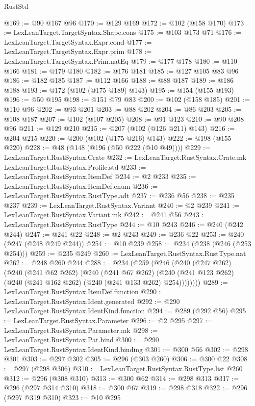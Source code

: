 \begin{lexlean}{RustStd}
\begin{coremodule}
@169 := @90 @167 @96
@170 := @129 @169
@172 := @102 (@158 @170)
@173 := LexLeanTarget.TargetSyntax.Shape.cons
@175 := @103 @173 @71
@176 := LexLeanTarget.TargetSyntax.Expr.cond
@177 := LexLeanTarget.TargetSyntax.Expr.prim
@178 := LexLeanTarget.TargetSyntax.Prim.natEq
@179 := @177 @178
@180 := @110 @166
@181 := @179 @180
@182 := @176 @181
@185 := @127 @105 @83 @96
@186 := @182 @185
@187 := @112 @166
@188 := @88 @187
@189 := @186 @188
@193 := @172 (@102 (@175 @189) @143)
@195 := @154 (@155 @193)
@196 := @50 @195
@198 := @151 @79 @83
@200 := @102 (@158 @185)
@201 := @110 @96
@202 := @93 @201
@203 := @88 @202
@204 := @86 @203
@205 := @108 @187
@207 := @102 (@107 @205)
@208 := @91 @123
@210 := @90 @208 @96
@211 := @129 @210
@215 := @207 (@102 (@126 @211) @143)
@216 := @204 @215
@220 := @200 (@102 (@175 @216) @143)
@222 := @198 (@155 @220)
@228 := @48 (@148 (@196 (@50 @222 (@10 @49))))
@229 := LexLeanTarget.RustSyntax.Crate
@232 := LexLeanTarget.RustSyntax.Crate.mk LexLeanTarget.RustSyntax.Profile.std
@233 := LexLeanTarget.RustSyntax.ItemDef
@234 := @2 @233
@235 := LexLeanTarget.RustSyntax.ItemDef.enum
@236 := LexLeanTarget.RustSyntax.RustType.adt
@237 := @236 @56
@238 := @235 @237
@239 := LexLeanTarget.RustSyntax.Variant
@240 := @2 @239
@241 := LexLeanTarget.RustSyntax.Variant.mk
@242 := @241 @56
@243 := LexLeanTarget.RustSyntax.RustType
@244 := @10 @243
@246 := @240 (@242 @244)
@247 := @241 @22
@248 := @2 @243
@249 := @236 @22
@253 := @240 (@247 (@248 @249 @244))
@254 := @10 @239
@258 := @234 (@238 (@246 (@253 @254)))
@259 := @235 @249
@260 := LexLeanTarget.RustSyntax.RustType.nat
@262 := @248 @260 @244
@288 := @234
    (@259
      (@246
        (@240
          (@247 @262)
          (@240
            (@241 @62 @262)
            (@240
              (@241 @67 @262)
              (@240 (@241 @123 @262) (@240 (@241 @162 @262) (@240 (@241 @133 @262) @254))))))))
@289 := LexLeanTarget.RustSyntax.ItemDef.function
@290 := LexLeanTarget.RustSyntax.Ident.generated
@292 := @290 LexLeanTarget.RustSyntax.IdentKind.function
@294 := @289 (@292 @56)
@295 := LexLeanTarget.RustSyntax.Parameter
@296 := @2 @295
@297 := LexLeanTarget.RustSyntax.Parameter.mk
@298 := LexLeanTarget.RustSyntax.Pat.bind
@300 := @290 LexLeanTarget.RustSyntax.IdentKind.binding
@301 := @300 @56
@302 := @298 @301
@303 := @297 @302
@305 := @296 (@303 @260)
@306 := @300 @22
@308 := @297 (@298 @306)
@310 := LexLeanTarget.RustSyntax.RustType.list @260
@312 := @296 (@308 @310)
@313 := @300 @62
@314 := @298 @313
@317 := @296 (@297 @314 @310)
@318 := @300 @67
@319 := @298 @318
@322 := @296 (@297 @319 @310)
@323 := @10 @295

\end{coremodule}
\end{lexlean}

